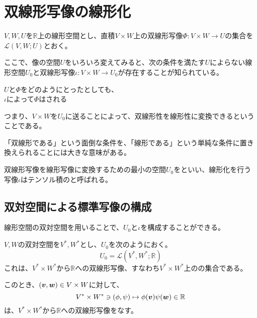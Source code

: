 \documentclass[../../../topic_linear-algebra]{subfiles}
\begin{document}
\sectionline
\section{双線形写像の線形化}

$V, W, U$を$\mathbb{R}$上の線形空間とし、直積$V \times W$上の双線形写像$\Phi\colon V \times W \to U$の集合を$\mathcal{L}(V, W; U)$とおく。

\br

ここで、像の空間$U$をいろいろ変えてみると、次の条件を満たす$U$によらない線形空間$U_0$と双線形写像$\iota\colon V \times W \to U_0$が存在することが知られている。

\begin{spacebox}
  \begin{center}
    $U$と$\Phi$をどのようにとったとしても、\\
    $\iota$によって$\Phi$はされる
  \end{center}
\end{spacebox}

つまり、$V \times W$を$U_0$に送ることによって、双線形性を線形性に変換できるということである。

「双線形である」という面倒な条件を、「線形である」という単純な条件に置き換えられることには大きな意味がある。

\br

双線形写像を線形写像に変換するための最小の空間$U_0$をといい、線形化を行う写像$\iota$はテンソル積のと呼ばれる。

\subsection{双対空間による標準写像の構成}

線形空間の双対空間を用いることで、$U_0$と$\iota$を構成することができる。

\br

$V,W$の双対空間を$V^*, W^*$とし、$U_0$を次のようにおく。
\begin{equation*}
  U_0 = \mathcal{L}(V^*, W^*; \mathbb{R})
\end{equation*}
これは、$V^* \times W^*$から$\mathbb{R}$への双線形写像、すなわち$V^* \times W^*$上のの集合である。

\br

このとき、$(\vb*{v}, \vb*{w}) \in V \times W$に対して、
\begin{equation*}
  V^* \times W^* \ni (\phi, \psi) \mapsto \phi(\vb*{v}) \psi(\vb*{w}) \in \mathbb{R}
\end{equation*}
は、$V^* \times W^*$から$\mathbb{R}$への双線形写像をなす。
\end{document}
